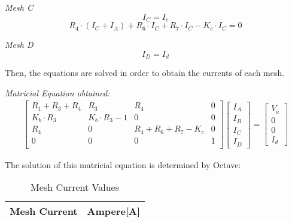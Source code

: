 \textit{Mesh C}
\begin{equation}
  I_C=I_c
  \label{eq:kvlaux}
\end{equation}
\begin{equation}
  R_4 \cdot (I_C + I_A) + R_6 \cdot I_C + R_7 \cdot I_C - K_c \cdot I_C = 0
  \label{eq:kvl3}
\end{equation}

\textit{Mesh D}
\begin{equation}
  I_D =I_d
  \label{eq:kvl4}
\end{equation}

Then, the equations are solved in order to obtain the currents of each mesh.

\textit{Matricial Equation obtained:}
\begin{gather}
	\begin{bmatrix}
		R_1 + R_3 + R_4 & R_3 & R_4 & 0  \\
		K_b \cdot R_3 & K_b \cdot R_3 - 1& 0 & 0 \\
		R_4 & 0 & R_4 + R_6 + R_ 7 - K_c & 0 \\
		0 & 0 & 0 & 1 \\
	\end{bmatrix}
	\begin {bmatrix} I_A \\ I_B \\ I_C \\ I_D \end{bmatrix}
	=
	\begin {bmatrix} V_a \\ 0 \\ 0 \\ I_d \end{bmatrix}
\end{gather}

The solution of this matricial equation is determined by Octave:

\begin{table}[H]
  \centering
  \begin{tabular}{|l|r|}
    \hline    
    {\bf Mesh Current} & {\bf Ampere[A]} \\ \hline
    
  \end{tabular}
  \caption{Mesh Current Values}
  \label{tab:mesh}
\end{table}

